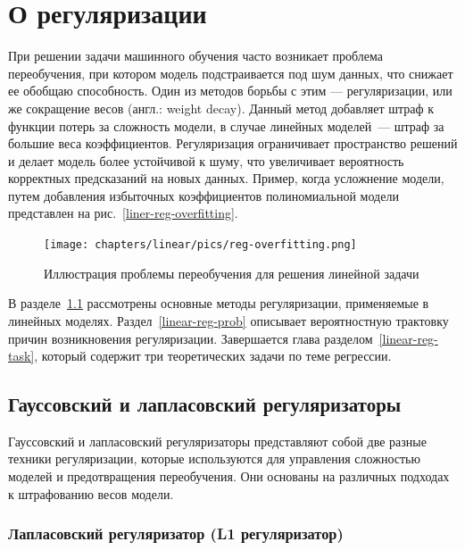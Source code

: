 
\section{О регуляризации}

При решении задачи машинного обучения часто возникает проблема переобучения, при котором модель подстраивается под шум данных, что снижает ее обобщаю способность.
Один из методов борьбы с этим --- регуляризации, или же сокращение весов (англ.: weight decay). Данный метод добавляет штраф к функции потерь за сложность модели, в случае линейных моделей~--- штраф за большие веса коэффициентов. Регуляризация ограничивает пространство решений и делает модель более устойчивой к шуму, что увеличивает вероятность корректных предсказаний на новых данных. Пример, когда усложнение модели, путем добавления избыточных коэффициентов полиномиальной модели представлен на рис.~\ref{liner-reg-overfitting}.

\begin{figure}[ht]
	\centering
	\texttt{[image: chapters/linear/pics/reg-overfitting.png]}
	\caption{Иллюстрация проблемы переобучения для решения линейной задачи}
	\label{linear-reg-overfitting}
\end{figure}

В разделе~\ref{linear-reg-l1l2} рассмотрены основные методы регуляризации, применяемые в линейных моделях. Раздел~\ref{linear-reg-prob} описывает вероятностную трактовку причин возникновения регуляризации. Завершается глава разделом~\ref{linear-reg-task}, который содержит три теоретических задачи по теме регрессии.

\subsection{Гауссовский и лапласовский регуляризаторы}
\label{linear-reg-l1l2}

Гауссовский и лапласовский регуляризаторы представляют собой две разные техники регуляризации, которые используются для управления сложностью моделей и предотвращения переобучения. Они основаны на различных подходах к штрафованию весов модели.

\subsubsection{Лапласовский регуляризатор (L1 регуляризатор)}

